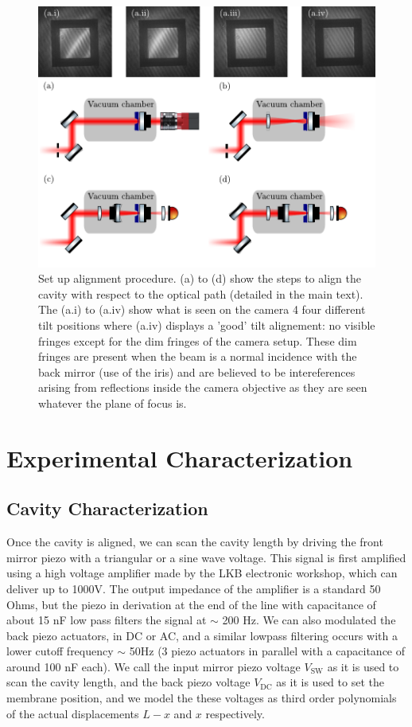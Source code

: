 \begin{figure}[h!]
    \centering  
    \includegraphics[width=\textwidth]{./chap5/fig/tilt_alignementB.pdf}
    \caption{Set up alignment procedure. (a) to (d) show the steps to align the cavity with respect to the optical path (detailed in the main text). The (a.i) to (a.iv) show what is seen on the camera 4 four different tilt positions where (a.iv) displays a 'good' tilt alignement: no visible fringes except for the dim fringes of the camera setup. These dim fringes are present when the beam is a normal incidence with the back mirror (use of the iris) and are believed to be intereferences arising from reflections inside the camera objective as they are seen whatever the plane of focus is. }
    \label{fig:tilt}
\end{figure}
\section{Experimental Characterization}
\subsection{Cavity Characterization}
Once the cavity is aligned, we can scan the cavity length by driving the front mirror piezo with a triangular or a sine wave voltage. This signal is first amplified using a high voltage amplifier made by the LKB electronic workshop, which can deliver up to 1000V. The output impedance of the amplifier is a standard 50 Ohms, but the piezo in derivation at the end of the line with capacitance of about 15 nF low pass filters the signal at  $\sim$ 200 Hz. We can also modulated the back piezo actuators, in DC or AC, and a similar lowpass filtering occurs with a lower cutoff frequency $\sim$ 50Hz (3 piezo actuators in parallel with a capacitance of around 100 nF each). We call the input mirror piezo voltage $V_{\text{SW}}$ as it is used to scan the cavity length, and the back piezo voltage $V_{\text{DC}}$ as it is used to set the membrane position, and we model the these voltages as third order polynomials of the actual displacements $L-x$ and $x$ respectively. \\

